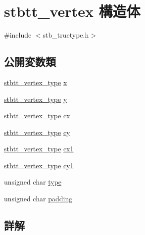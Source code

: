 \hypertarget{structstbtt__vertex}{}\section{stbtt\+\_\+vertex 構造体}
\label{structstbtt__vertex}


{\ttfamily \#include $<$stb\+\_\+truetype.\+h$>$}

\subsection*{公開変数類}
\begin{DoxyCompactItemize}
\item 
\mbox{\hyperlink{stb__truetype_8h_ab8fd8e5e0b82b0f7da54532035e47b22}{stbtt\+\_\+vertex\+\_\+type}} \mbox{\hyperlink{structstbtt__vertex_a81773edbe760d0e090561a3c1e86c919}{x}}
\item 
\mbox{\hyperlink{stb__truetype_8h_ab8fd8e5e0b82b0f7da54532035e47b22}{stbtt\+\_\+vertex\+\_\+type}} \mbox{\hyperlink{structstbtt__vertex_a9052065ca544b63d537325b246928cfc}{y}}
\item 
\mbox{\hyperlink{stb__truetype_8h_ab8fd8e5e0b82b0f7da54532035e47b22}{stbtt\+\_\+vertex\+\_\+type}} \mbox{\hyperlink{structstbtt__vertex_a43835489e2a151b31cb100d20f8adeae}{cx}}
\item 
\mbox{\hyperlink{stb__truetype_8h_ab8fd8e5e0b82b0f7da54532035e47b22}{stbtt\+\_\+vertex\+\_\+type}} \mbox{\hyperlink{structstbtt__vertex_a5610d6335aa6962d970fc7fd2225545e}{cy}}
\item 
\mbox{\hyperlink{stb__truetype_8h_ab8fd8e5e0b82b0f7da54532035e47b22}{stbtt\+\_\+vertex\+\_\+type}} \mbox{\hyperlink{structstbtt__vertex_a1c45a8d41727b24b84f97a944f2b800a}{cx1}}
\item 
\mbox{\hyperlink{stb__truetype_8h_ab8fd8e5e0b82b0f7da54532035e47b22}{stbtt\+\_\+vertex\+\_\+type}} \mbox{\hyperlink{structstbtt__vertex_a68227d28643f5667064fa3c385f4ea7d}{cy1}}
\item 
unsigned char \mbox{\hyperlink{structstbtt__vertex_aa325b3707b88e7e104c0de46bb2bf395}{type}}
\item 
unsigned char \mbox{\hyperlink{structstbtt__vertex_a8bd328747e8ea018612960a52e3e3ede}{padding}}
\end{DoxyCompactItemize}


\subsection{詳解}


